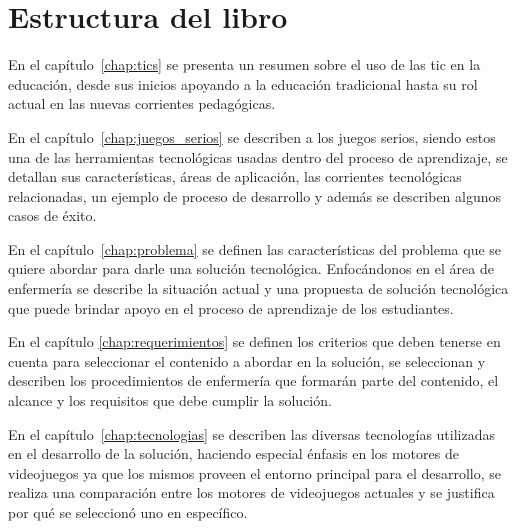 \section{Estructura del libro}
    

En el capítulo~\ref{chap:tics} se presenta un resumen sobre el uso de las
\Gls{tic} en la educación, desde sus inicios apoyando a la educación tradicional
hasta su rol actual en las nuevas corrientes pedagógicas. 


En el capítulo~\ref{chap:juegos_serios} se describen a los juegos serios, siendo
estos una de las herramientas tecnológicas usadas dentro del proceso de
aprendizaje, se detallan sus características, áreas de aplicación, las
corrientes tecnológicas relacionadas, un ejemplo de proceso de desarrollo y además se 
describen algunos casos de éxito. 



En el capítulo~\ref{chap:problema} se definen las características del problema
que se quiere abordar para darle una solución tecnológica. Enfocándonos en el
área de enfermería se describe la situación actual y una propuesta de solución
tecnológica que puede brindar apoyo en el proceso de aprendizaje de los 
estudiantes.


En el capítulo \ref{chap:requerimientos} se definen los criterios que deben
tenerse en cuenta para seleccionar el contenido a abordar en la solución, se
seleccionan y describen los procedimientos de enfermería que formarán parte del
contenido, el alcance  y los requisitos que debe cumplir la solución.


En el capítulo~\ref{chap:tecnologias} se describen las diversas tecnologías
utilizadas en el desarrollo de la solución, haciendo especial énfasis en los
motores de videojuegos ya que los mismos proveen el entorno principal para el
desarrollo, se realiza una comparación entre los motores de
videojuegos actuales y se justifica por qué se seleccionó uno en específico. 



